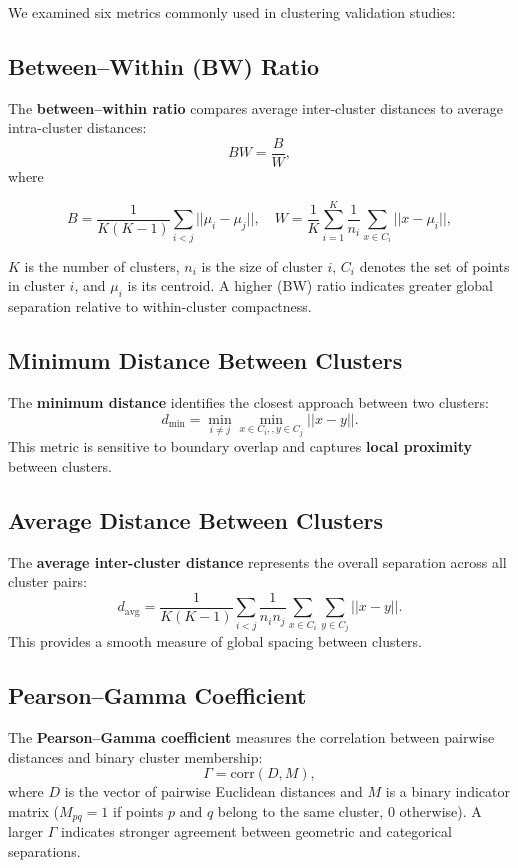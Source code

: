 \documentclass[
  11pt,
  a4paper,
]{report}
\begin{document}
We examined six metrics commonly used in clustering validation studies:

\subsection{Between--Within (BW) Ratio}\label{betweenwithin-bw-ratio}

The \textbf{between--within ratio} compares average inter-cluster
distances to average intra-cluster distances: \[
BW = \frac{B}{W},
\] where

\[
B = \frac{1}{K(K-1)} \sum_{i < j} ||\mu_i - \mu_j||,
\quad
W = \frac{1}{K} \sum_{i=1}^{K} \frac{1}{n_i} \sum_{x \in C_i} ||x - \mu_i||,
\]

\(K\) is the number of clusters, \(n_i\) is the size of cluster \(i\),
\(C_i\) denotes the set of points in cluster \(i\), and \(\mu_i\) is its
centroid. A higher (BW) ratio indicates greater global separation
relative to within-cluster compactness.

\subsection{Minimum Distance Between
Clusters}\label{minimum-distance-between-clusters}

The \textbf{minimum distance} identifies the closest approach between
two clusters: \[
d_{\min} = \min_{i \neq j} \min_{x \in C_i, , y \in C_j} ||x - y||.
\] This metric is sensitive to boundary overlap and captures
\textbf{local proximity} between clusters.

\subsection{Average Distance Between
Clusters}\label{average-distance-between-clusters}

The \textbf{average inter-cluster distance} represents the overall
separation across all cluster pairs: \[
d_{\text{avg}} = \frac{1}{K(K-1)} \sum_{i < j} \frac{1}{n_i n_j}
\sum_{x \in C_i} \sum_{y \in C_j} ||x - y||.
\] This provides a smooth measure of global spacing between clusters.

\subsection{Pearson--Gamma Coefficient}\label{pearsongamma-coefficient}

The \textbf{Pearson--Gamma coefficient} measures the correlation between
pairwise distances and binary cluster membership: \[
\Gamma = \text{corr}(D, M),
\] where \(D\) is the vector of pairwise Euclidean distances and \(M\)
is a binary indicator matrix (\(M_{pq} = 1\) if points \(p\) and \(q\)
belong to the same cluster, \(0\) otherwise). A larger \(\Gamma\)
indicates stronger agreement between geometric and categorical
separations.
\end{document}
